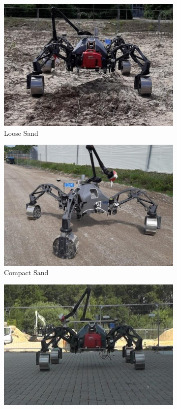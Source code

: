 \documentclass{article}
\begin{document}
\begin{figure}[!htb]
    \begin{subfigure}[t]{0.32\textwidth}
        \includegraphics[width=\textwidth]{../figures/unprepsand.png}
        \caption{Loose Sand}
    \end{subfigure}
    \begin{subfigure}[t]{0.32\textwidth}
        \includegraphics[width=\textwidth]{../figures/compact.png}
        \caption{Compact Sand}
    \end{subfigure}
    \begin{subfigure}[t]{0.32\textwidth}
        \includegraphics[width=\textwidth]{../figures/concrete_v2.png}

\end{subfigure}
\end{figure}
\end{document}
